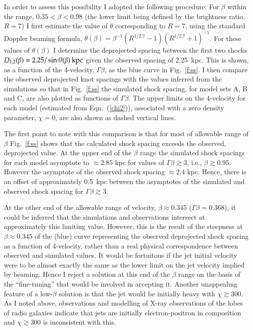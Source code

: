 In order to assess this possibility I adopted the following procedure: For $\beta$ within the range, $0.35 < \beta < 0.98$ (the lower limit being defined by the brightness ratio, $R=7$) I first estimate the value of $\theta$ corresponding to $R = 7$, using the standard Doppler beaming formula, $\theta (\beta)= \beta^{-1}(R^{1/2.7}-1)(R^{1/2.7}+1)^{-1}$. For these values of $\theta(\beta)$ I determine the deprojected spacing between the first two shocks $D_{1,2}(\beta) = 2.25 /\sin \theta(\beta) \> \rm kpc$ given the observed spacing of 2.25~kpc. This is shown, as a function of the 4-velocity, $\Gamma \beta$, as the blue curve in Fig.~\ref{f:ss}. I then compare the observed deprojected knot spacings with the values inferred from the simulations so that in Fig.~\ref{f:ss} the simulated shock spacing, for model sets A, B and C, are also plotted as functions of $\Gamma \beta$. The upper limits on the 4-velocity for each model (estimated from Eqn.~(\ref{chi2})), associated with a zero density parameter, $\chi = 0$, are also shown as dashed vertical lines. 


The first point to note with this comparison is that for most of allowable range of $\beta$ Fig.~\ref{f:ss} shows that the calculated shock spacing exceeds the observed, deprojected value. At the upper end of the $\beta$ range the simulated shock spacings for each model asymptote to $\approx 2.85$ kpc for values of $\Gamma \beta \gtrsim 3$, i.e., $\beta \gtrsim 0.95$. However the asymptote of the observed shock spacing $\approx 2.4$ kpc. Hence, there is an offset of approximately 0.5~kpc between the asymptotes of the simulated and observed shock spacing for $\Gamma \beta \gtrsim 3$.  

At the other end of the allowable range of velocity, $\beta \approx 0.345$ ($\Gamma \beta = 0.368$), it could be inferred that the simulations and observations intersect at approximately this limiting value. However, this is the result of the steepness at $\beta \approx 0.345$ of the (blue) curve representing the observed deprojected shock spacing as a function of 4-velocity, rather than a real physical correspondence between observed and simulated values. It would be fortuitous if the jet initial velocity were to be almost exactly the same as the lower limit on the jet velocity implied by beaming. Hence I reject a solution at this end of the $\beta$ range on the basis of the ``fine-tuning'' that would be involved in accepting it. Another unappealing feature of a low-$\beta$ solution is that the jet would be initially heavy with $\chi \gtrsim 300$. 
As I noted above, observations and modelling of X-ray observations of the lobes of radio galaxies indicate that jets are initially electron-positron in composition \citep{croston05a,croston14} and $\chi \gtrsim 300$ is inconsistent with this. 
 
